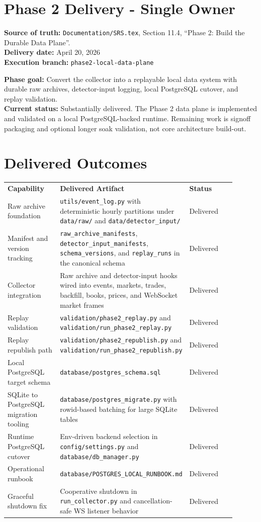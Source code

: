 \documentclass{article}
\begin{document}
\section*{Phase 2 Delivery - Single Owner}

\textbf{Source of truth:} \texttt{Documentation/SRS.tex}, Section 11.4, ``Phase 2: Build the Durable Data Plane''.\\
\textbf{Delivery date:} April 20, 2026\\
\textbf{Execution branch:} \texttt{phase2-local-data-plane}

\textbf{Phase goal:} Convert the collector into a replayable local data system with durable raw archives, detector-input logging, local PostgreSQL cutover, and replay validation.\\
\textbf{Current status:} Substantially delivered. The Phase 2 data plane is implemented and validated on a local PostgreSQL-backed runtime. Remaining work is signoff packaging and optional longer soak validation, not core architecture build-out.

\section*{Delivered Outcomes}
\begin{longtable}{p{0.26\linewidth}p{0.40\linewidth}p{0.24\linewidth}}
\textbf{Capability} & \textbf{Delivered Artifact} & \textbf{Status} \\
Raw archive foundation & \texttt{utils/event\_log.py} with deterministic hourly partitions under \texttt{data/raw/} and \texttt{data/detector\_input/} & Delivered \\
Manifest and version tracking & \texttt{raw\_archive\_manifests}, \texttt{detector\_input\_manifests}, \texttt{schema\_versions}, and \texttt{replay\_runs} in the canonical schema & Delivered \\
Collector integration & Raw archive and detector-input hooks wired into events, markets, trades, backfill, books, prices, and WebSocket market frames & Delivered \\
Replay validation & \texttt{validation/phase2\_replay.py} and \texttt{validation/run\_phase2\_replay.py} & Delivered \\
Replay republish path & \texttt{validation/phase2\_republish.py} and \texttt{validation/run\_phase2\_republish.py} & Delivered \\
Local PostgreSQL target schema & \texttt{database/postgres\_schema.sql} & Delivered \\
SQLite to PostgreSQL migration tooling & \texttt{database/postgres\_migrate.py} with rowid-based batching for large SQLite tables & Delivered \\
Runtime PostgreSQL cutover & Env-driven backend selection in \texttt{config/settings.py} and \texttt{database/db\_manager.py} & Delivered \\
Operational runbook & \texttt{database/POSTGRES\_LOCAL\_RUNBOOK.md} & Delivered \\
Graceful shutdown fix & Cooperative shutdown in \texttt{run\_collector.py} and cancellation-safe WS listener behavior & Delivered \\
\end{longtable}
\end{document}
